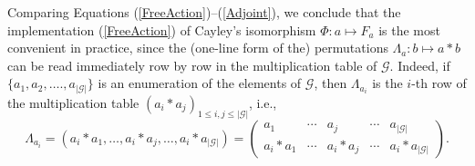 \documentclass{article}
\begin{document}
Comparing Equations (\ref{FreeAction})--(\ref{Adjoint}), we conclude that the
implementation (\ref{FreeAction}) of Cayley's isomorphism $\Phi :a\mapsto
F_{a}$ is the most convenient in practice, since the (one-line form of the)
permutations $\Lambda _{a}:b\mapsto a\ast b$ can be read immediately row by
row in the multiplication table of $\mathcal{G}$. Indeed, if $%
\{a_{1},a_{2},\ldots.,a_{\left\vert \mathcal{G}\right\vert }\}$ is an
enumeration of the elements of $\mathcal{G}$, then $\Lambda _{a_{i}}$ is the 
$i$-th row of the multiplication table
 $(a_{i}\ast a_{j})_{1\leq i,j\leq
\left\vert \mathcal{G}\right\vert }$, i.e.,%
\begin{equation}
\Lambda _{a_{i}}=(a_{i}\ast a_{1},\ldots,a_{i}\ast a_{j},\ldots,a_{i}\ast
a_{\left\vert \mathcal{G}\right\vert })=\left( 
\begin{array}{ccccc}
a_{1} & \cdots & a_{j} & \cdots & a_{\left\vert \mathcal{G}\right\vert } \\ 
a_{i}\ast a_{1} & \cdots & a_{i}\ast a_{j} & \cdots & a_{i}\ast
a_{\left\vert \mathcal{G}\right\vert }%
\end{array}%
\right) .  \label{Lambda(a)}
\end{equation}
\end{document}
